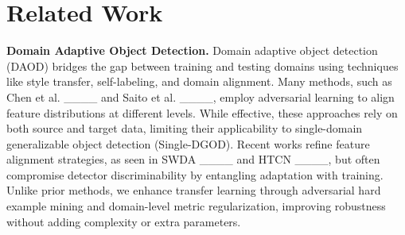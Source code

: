 \section{Related Work}

\textbf{Domain Adaptive Object Detection.} Domain adaptive object detection (DAOD) bridges the gap between training and testing domains using techniques like style transfer, self-labeling, and domain alignment. Many methods, such as Chen et al. ____ and Saito et al. ____, employ adversarial learning to align feature distributions at different levels. While effective, these approaches rely on both source and target data, limiting their applicability to single-domain generalizable object detection (Single-DGOD). Recent works refine feature alignment strategies, as seen in SWDA ____ and HTCN ____, but often compromise detector discriminability by entangling adaptation with training. Unlike prior methods, we enhance transfer learning through adversarial hard example mining and domain-level metric regularization, improving robustness without adding complexity or extra parameters.

